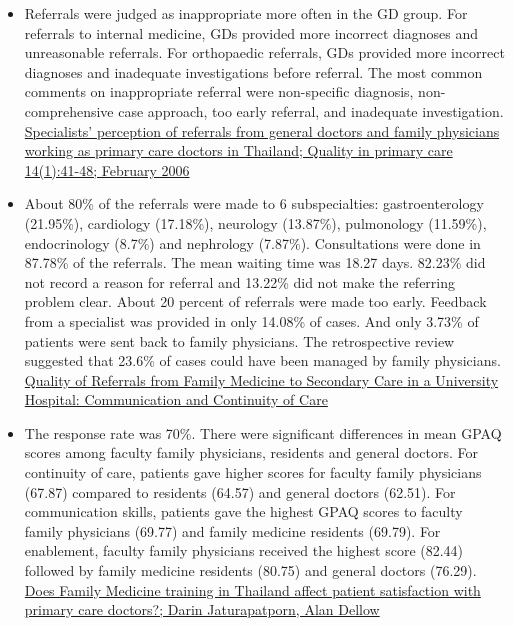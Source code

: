 \documentclass[]{book}
\begin{document}
\begin{itemize}
\item
  Referrals were judged as inappropriate more often in the GD group. For referrals to internal medicine, GDs provided more incorrect diagnoses and unreasonable referrals. For orthopaedic referrals, GDs provided more incorrect diagnoses and inadequate investigations before referral. The most common comments on inappropriate referral were non-specific diagnosis, non-comprehensive case approach, too early referral, and inadequate investigation. \href{https://www.researchgate.net/publication/233627532_Specialists'_perception_of_referrals_from_general_doctors_and_family_physicians_working_as_primary_care_doctors_in_Thailand}{Specialists' perception of referrals from general doctors and family physicians working as primary care doctors in Thailand; Quality in primary care 14(1):41-48; February 2006}
\item
  About 80\% of the referrals were made to 6 subspecialties: gastroenterology (21.95\%), cardiology (17.18\%), neurology (13.87\%), pulmonology (11.59\%), endocrinology (8.7\%) and nephrology (7.87\%). Consultations were done in 87.78\% of the referrals. The mean waiting time was 18.27 days. 82.23\% did not record a reason for referral and 13.22\% did not make the referring problem clear. About 20 percent of referrals were made too early. Feedback from a specialist was provided in only 14.08\% of cases. And only 3.73\% of patients were sent back to family physicians. The retrospective review suggested that 23.6\% of cases could have been managed by family physicians. \href{https://www.tci-thaijo.org/index.php/ramajournal/article/view/57463}{Quality of Referrals from Family Medicine to Secondary Care in a University Hospital: Communication and Continuity of Care}
\item
  The response rate was 70\%. There were significant differences in mean GPAQ scores among faculty family physicians, residents and general doctors. For continuity of care, patients gave higher scores for faculty family physicians (67.87) compared to residents (64.57) and general doctors (62.51). For communication skills, patients gave the highest GPAQ scores to faculty family physicians (69.77) and family medicine residents (69.79). For enablement, faculty family physicians received the highest score (82.44)
  followed by family medicine residents (80.75) and general doctors (76.29). \href{https://www.ncbi.nlm.nih.gov/pmc/articles/PMC1852109/pdf/1471-2296-8-14.pdf}{Does Family Medicine training in Thailand affect patient satisfaction with primary care doctors?; Darin Jaturapatporn, Alan Dellow}
\end{itemize}
\end{document}
